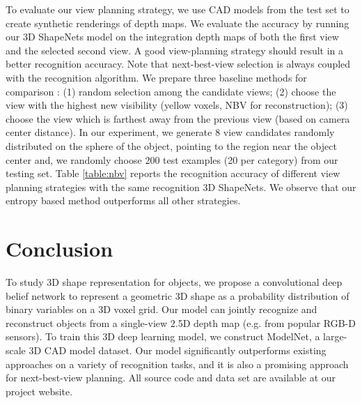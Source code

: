 \documentclass[10pt,twocolumn,letterpaper]{article}
\begin{document}
To evaluate our view planning strategy, we use CAD models from the test set to create synthetic renderings of depth maps. 
We evaluate the accuracy by running our 3D ShapeNets model on the integration depth maps of both the first view and the selected second view.
A good view-planning strategy should result in a better recognition accuracy.
Note that next-best-view selection is always coupled with the recognition algorithm.
We prepare three baseline methods for comparison : (1) random selection among the candidate views; 
(2) choose the view with the highest new visibility (yellow voxels, NBV for reconstruction); 
(3) choose the view which is farthest away from the previous view (based on camera center distance). 
In our experiment, we generate 8 view candidates randomly distributed on the sphere of the object, 
pointing to the region near the object center and, we randomly choose 200 test examples (20 per category) from our testing set. 
Table \ref{table:nbv} reports the recognition accuracy of different view planning strategies with the same recognition 3D ShapeNets.
We observe that our entropy based method outperforms all other strategies. 

\iffalse
Sometimes, having two views is not enough and a sequence of views is needed for recognition. 
The best view planning strategies should take the minimal steps to reach the accuracy upper bound for the recognition algorithm. 
With the same experiment settings, we run the above view planning strategies in 4 steps. 
In each step, 8 random new views are generated for selection. 
All these view planning strategies are greedy in a sense that they are not optimized for global planning. 
As the result shows in Figure \ref{fig:feature}(c), our view planning significantly outperforms other methods. 
We only need ??? steps to achieve the same recognition accuracy with ??? steps by others.
\fi

\section{Conclusion}

To study 3D shape representation for objects,
we propose a convolutional deep belief network to
represent a geometric 3D shape as a probability distribution of binary variables on a 3D voxel grid.
Our model can jointly recognize and reconstruct objects from a single-view 2.5D depth map (e.g. from popular RGB-D sensors).
To train this 3D deep learning model, 
we construct ModelNet, a large-scale 3D CAD model dataset.
Our model significantly outperforms existing approaches on a variety
of recognition tasks, and it is also a promising approach for next-best-view planning.
All source code and data set are available at our project website.
\end{document}
